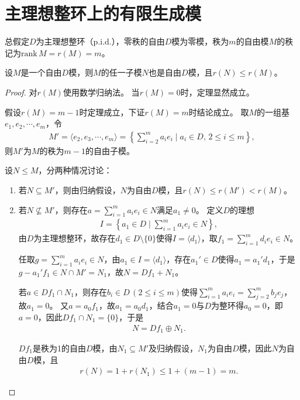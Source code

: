 \documentclass[../../main.tex]{subfiles}%
\begin{document}
\section{主理想整环上的有限生成模}

总假定$D$为主理想整环（p.i.d.），零秩的自由$D$模为零模，秩为$m$的自由模$M$的秩记为$\mathrm{rank}\,M=r(M)=m$。

\begin{theorem}
设$M$是一个自由$D$模，则$M$的任一子模$N$也是自由$D$模，且$r(N)\leqslant r(M)$。
\end{theorem}
\begin{proof}

对$r(M)$使用数学归纳法。
当$r(M)=0$时，定理显然成立。

假设$r(M)=m-1$时定理成立，下证$r(M)=m$时结论成立。
取$M$的一组基$e_1,e_2,\cdots,e_m$，令
\begin{align*}
M'=\langle e_2,e_3,\cdots,e_m\rangle=\left\{\sum_{i=2}^{m}a_ie_i\mid a_i\in D,\,2\leqslant i\leqslant m\right\},
\end{align*}
则$M'$为$M$的秩为$m-1$的自由子模。

设$N\leqslant M$，分两种情况讨论：
\begin{enumerate}[(1)]
\item 若$N\subseteq M'$，则由归纳假设，$N$为自由$D$模，且$r(N)\leqslant r(M')<r(M)$。
\item 若$N\nsubseteq M'$，则存在$a=\sum_{i=1}^{m}a_ie_i\in N$满足$a_1\neq0$。
定义$D$的理想
\begin{align*}
I=\left\{a_1\in D\mid \sum_{i=1}^{m}a_ie_i\in N\right\},
\end{align*}
由$D$为主理想整环，故存在$d_1\in D\setminus\{0\}$使得$I=\langle d_1\rangle$，取$f_1=\sum_{i=1}^{m}d_ie_i\in N$。

任取$g=\sum_{i=1}^{m}a_ie_i\in N$，由$a_1\in I=\langle d_1\rangle$，存在$a_1'\in D$使得$a_1=a_1'd_1$，于是$g-a_1'f_1\in N\cap M'=N_1$，故$N=Df_1+N_1$。

若$a\in Df_1\cap N_1$，则存在$b_i\in D\,(2\leqslant i\leqslant m)$使得$\sum_{i=1}^{m}a_ie_i=\sum_{j=2}^{m}b_je_j$，故$a_1=0$。
又$a=a_0f_1$，故$a_1=a_0d_1$，结合$a_1=0$与$D$为整环得$a_0=0$，即$a=0$，因此$Df_1\cap N_1=\{0\}$，于是
\begin{align*}
N=Df_1\oplus N_1.
\end{align*}

$Df_1$是秩为1的自由$D$模，由$N_1\subseteq M'$及归纳假设，$N_1$为自由$D$模，因此$N$为自由$D$模，且
\begin{align*}
r(N)=1+r(N_1)\leqslant1+(m-1)=m.
\end{align*}
\end{enumerate}

\end{proof}
\end{document}
